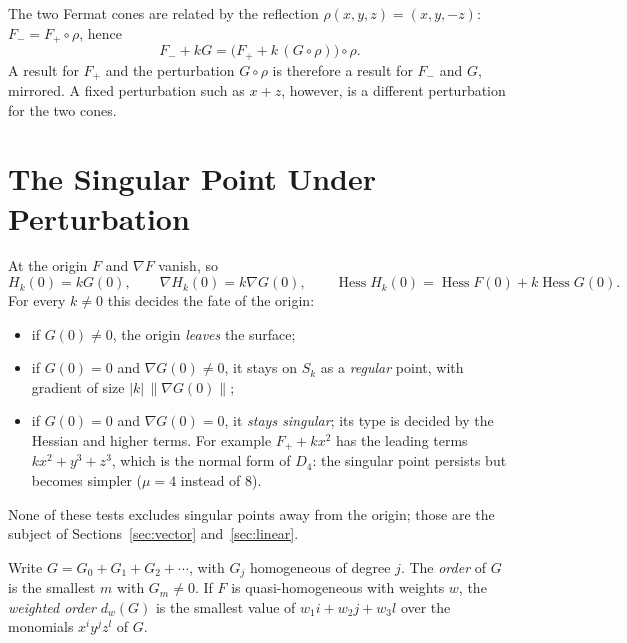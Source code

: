 The two Fermat cones are related by the reflection $\rho(x,y,z)=(x,y,-z)$:
$F_-=F_+\circ\rho$, hence
\begin{equation}
\label{eq:reflection}
F_-+kG=\big(F_++k\,(G\circ\rho)\big)\circ\rho .
\end{equation}
A result for $F_+$ and the perturbation $G\circ\rho$ is therefore a result for
$F_-$ and $G$, mirrored. A fixed perturbation such as $x+z$, however, is a
different perturbation for the two cones.

\section{The Singular Point Under Perturbation}
\label{sec:point-under-perturbation}

At the origin $F$ and $\nabla F$ vanish, so
\begin{equation}
\label{eq:at-origin}
H_k(0)=kG(0),\qquad \nabla H_k(0)=k\nabla G(0),\qquad
\operatorname{Hess}H_k(0)=\operatorname{Hess}F(0)+k\operatorname{Hess}G(0).
\end{equation}
For every $k\neq0$ this decides the fate of the origin:
\begin{itemize}
    \item if $G(0)\neq0$, the origin \emph{leaves} the surface;
    \item if $G(0)=0$ and $\nabla G(0)\neq0$, it stays on $S_k$ as a
          \emph{regular} point, with gradient of size $|k|\,\|\nabla G(0)\|$;
    \item if $G(0)=0$ and $\nabla G(0)=0$, it \emph{stays singular}; its type
          is decided by the Hessian and higher terms. For example
          $F_++kx^2$ has the leading terms $kx^2+y^3+z^3$, which is the
          normal form of $D_4$: the singular point persists but becomes
          simpler ($\mu=4$ instead of $8$).
\end{itemize}
None of these tests excludes singular points away from the origin; those are
the subject of Sections~\ref{sec:vector} and~\ref{sec:linear}.

\begin{definition}
\label{def:order}
Write $G=G_0+G_1+G_2+\cdots$, with $G_j$ homogeneous of degree $j$. The
\emph{order} of $G$ is the smallest $m$ with $G_m\neq0$. If $F$ is
quasi-homogeneous with weights $w$, the \emph{weighted order} $d_w(G)$ is the
smallest value of $w_1i+w_2j+w_3l$ over the monomials $x^iy^jz^l$ of $G$.
\end{definition}

